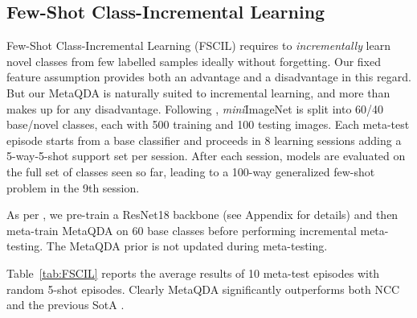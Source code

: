 \documentclass[10pt,twocolumn,letterpaper]{article}
\def\miniIN{\textit{mini}ImageNet}
\begin{document}
\subsection{Few-Shot Class-Incremental Learning}
Few-Shot Class-Incremental Learning (FSCIL) requires to \emph{incrementally} learn novel classes \cite{rebuffi2017icarl} from few labelled samples \cite{ren2019attentionAttractor,tao2020few} ideally without forgetting. Our fixed feature assumption provides both an advantage and a disadvantage in this regard. But our MetaQDA is naturally suited to incremental learning, and more than makes up for any disadvantage. Following \cite{tao2020few}, \miniIN{} is split into 60/40  base/novel classes, each with 500 training and 100 testing images. Each meta-test episode starts from a base classifier and proceeds in 8 learning sessions adding a 5-way-5-shot support set per session. After each session, models are evaluated on the full set of classes seen so far, leading to a 100-way generalized few-shot problem in the 9th session. 


As per \cite{tao2020few}, we pre-train a ResNet18 backbone (see Appendix for details) and then meta-train MetaQDA on 60 base classes before performing incremental meta-testing. The MetaQDA prior is not updated during meta-testing.

Table~\ref{tab:FSCIL} reports the average results of 10 meta-test episodes with random 5-shot episodes. Clearly MetaQDA significantly outperforms both NCC and the previous SotA \cite{tao2020few}.

\setlength{\tabcolsep}{4.8pt}
\begin{table*}[h]
\centering
\footnotesize
{}
\caption{\small \small
\textbf{Class-incremental few-shot learning with ResNet18 on \miniIN.} Start with 60-way base classifier and add 5-way/5-shot per session. At each session, the models are evaluated on the test sets of the full set of classes encountered so far. (\#): classifier-way at each session.
}
\label{tab:FSCIL}
\end{table*}
\end{document}
